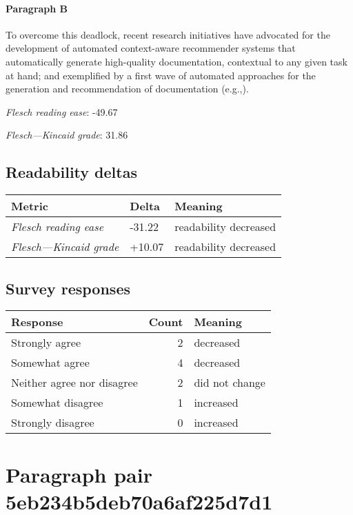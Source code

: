 \paragraph{Paragraph B}
To overcome this deadlock, recent research initiatives have advocated for the development of automated context-aware recommender systems that automatically generate high-quality documentation, contextual to any given task at hand; and exemplified by a first wave of automated approaches for the generation and recommendation of documentation (e.g.,).\par\medskip
\emph{Flesch reading ease}: -49.67\par
\emph{Flesch---Kincaid grade}: 31.86

\subsection{Readability deltas}

\begin{tabular}{lll}
\toprule
               \textbf{Metric} & \textbf{Delta} &       \textbf{Meaning} \\
\midrule
    \emph{Flesch reading ease} &         -31.22 &  readability decreased \\
 \emph{Flesch---Kincaid grade} &         +10.07 &  readability decreased \\
\bottomrule
\end{tabular}

\subsection{Survey responses}
\begin{tabular}{lrl}
\toprule
          \textbf{Response} &  \textbf{Count} & \textbf{Meaning} \\
\midrule
             Strongly agree &               2 &        decreased \\
             Somewhat agree &               4 &        decreased \\
 Neither agree nor disagree &               2 &   did not change \\
          Somewhat disagree &               1 &        increased \\
          Strongly disagree &               0 &        increased \\
\bottomrule
\end{tabular}

\section{Paragraph pair 5eb234b5deb70a6af225d7d1}
